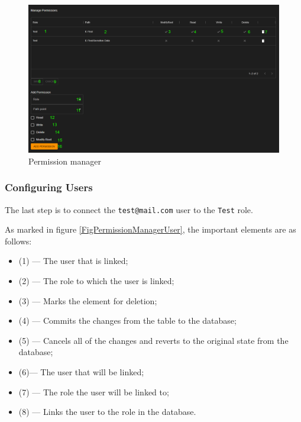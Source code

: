 \begin{figure}[htbp]
	\centering
		\includegraphics[scale=0.3]{./figures/chapter4/permission_manager_permission.png}
	\caption{Permission manager}
	\label{FigPermissionManagerPermission}
\end{figure}


\subsubsection{Configuring Users}
The last step is to connect the \verb|test@mail.com| user to the \verb|Test| role.

As marked in figure \ref{FigPermissionManagerUser}, the important elements are as follows:
\begin{itemize}
	\item (1) --- The user that is linked;
	\item (2) --- The role to which the user is linked;
	\item (3) --- Marks the element for deletion;
	\item (4) --- Commits the changes from the table to the database;
	\item (5) --- Cancels all of the changes and reverts to the original state from the database;
	\item (6)--- The user that will be linked;
	\item (7) --- The role the user will be linked to;
	\item (8) --- Links the user to the role in the database.
\end{itemize}

